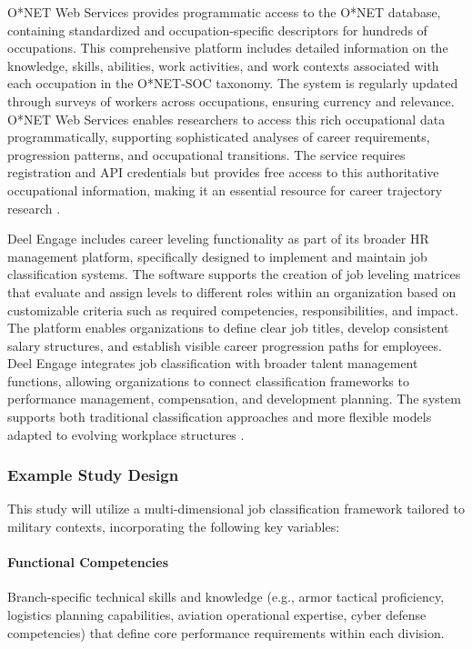 \documentclass[../main.tex]{subfiles}
\begin{document}
O*NET Web Services provides programmatic access to the O*NET database, containing standardized and occupation-specific descriptors for hundreds of occupations. This comprehensive platform includes detailed information on the knowledge, skills, abilities, work activities, and work contexts associated with each occupation in the O*NET-SOC taxonomy. The system is regularly updated through surveys of workers across occupations, ensuring currency and relevance. O*NET Web Services enables researchers to access this rich occupational data programmatically, supporting sophisticated analyses of career requirements, progression patterns, and occupational transitions. The service requires registration and API credentials but provides free access to this authoritative occupational information, making it an essential resource for career trajectory research \cite{onet2024, onetonline2024}.

Deel Engage includes career leveling functionality as part of its broader HR management platform, specifically designed to implement and maintain job classification systems. The software supports the creation of job leveling matrices that evaluate and assign levels to different roles within an organization based on customizable criteria such as required competencies, responsibilities, and impact. The platform enables organizations to define clear job titles, develop consistent salary structures, and establish visible career progression paths for employees. Deel Engage integrates job classification with broader talent management functions, allowing organizations to connect classification frameworks to performance management, compensation, and development planning. The system supports both traditional classification approaches and more flexible models adapted to evolving workplace structures \cite{deel2024}.

\subsubsection{Example Study Design}

This study will utilize a multi-dimensional job classification framework tailored to military contexts, incorporating the following key variables:

\paragraph{Functional Competencies} Branch-specific technical skills and knowledge (e.g., armor tactical proficiency, logistics planning capabilities, aviation operational expertise, cyber defense competencies) that define core performance requirements within each division.
\end{document}
